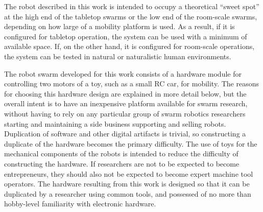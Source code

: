 The robot described in this work is intended to occupy a theoretical ``sweet spot'' at the high end of the tabletop swarms or the low end of the room-scale swarms, depending on how large of a mobility platform is used. 
As a result, if it is configured for tabletop operation, the system can be used with a minimum of available space. 
If, on the other hand, it is configured for room-scale operations, the system can be tested in natural or naturalistic human environments. 

The robot swarm developed for this work consists of a hardware module for controlling two motors of a toy, such as a small RC car, for mobility. 
The reasons for choosing this hardware design are explained in more detail below, but the overall intent is to have an inexpensive platform available for swarm research, without having to rely on any particular group of swarm robotics researchers starting and maintaining a side business supporting and selling robots.
Duplication of software and other digital artifacts is trivial, so constructing a duplicate of the hardware becomes the primary difficulty. 
The use of toys for the mechanical components of the robots is intended to reduce the difficulty of constructing the hardware. 
If researchers are not to be expected to become entrepreneurs, they should also not be expected to become expert machine tool operators.
The hardware resulting from this work is designed so that it can be duplicated by a researcher using common tools, and possessed of no more than hobby-level familiarity with electronic hardware.

